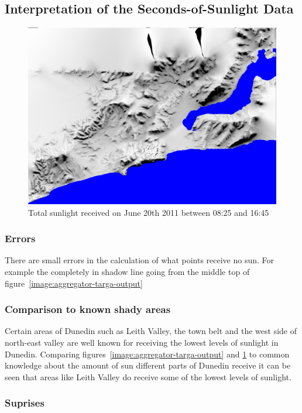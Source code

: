 \documentclass[12pt]{report}
\begin{document}
\subsection{Interpretation of the Seconds-of-Sunlight Data}
\begin{figure}[h]
\centering
\includegraphics[scale=0.25]{wintersolstice.png}
\caption{Total sunlight received on June 20th 2011 between 08:25 and 16:45}
\label{image:wintersolstice}
\end{figure}
\subsubsection{Errors}
There are small errors in the calculation of what points receive no sun. For example the completely in shadow line going from the middle top of figure~\ref{image:aggregator-targa-output}

\subsubsection{Comparison to known shady areas}
Certain areas of Dunedin such as Leith Valley, the town belt and the west side of north-east valley are well known for receiving the lowest levels of sunlight in Dunedin. Comparing figures~\ref{image:aggregator-targa-output} and \ref{image:wintersolstice} to common knowledge about the amount of sun different parts of Dunedin receive it can be seen that areas like Leith Valley do receive some of the lowest levels of sunlight.

\subsubsection{Suprises}
\end{document}

